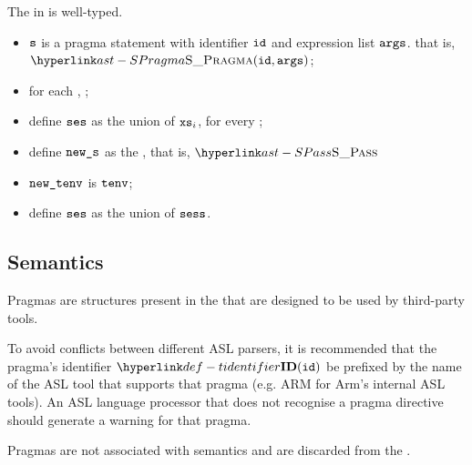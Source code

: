 The \pragmastatementterm{} in  is well-typed.

\ProseParagraph
\AllApply
\begin{itemize}
  \item $\vs$ is a pragma statement with identifier $\id$ and expression list $\vargs$. that is, $\SPragma(\id, \vargs)$;
  \item for each , \ProseOrTypeError;
  \item define $\vses$ as the union of $\vxs_i$, for every ;
  \item define $\news$ as the \passstatementterm, that is, $\SPass$
  \item $\newtenv$ is $\tenv$;
  \item define $\vses$ as the union of $\vsess$.
\end{itemize}

\FormallyParagraph
\begin{mathpar}
\end{mathpar}

\subsection{Semantics\label{sec:PragmaSemantics}}
Pragmas are structures present in the \untypedast{} that are designed to be used
by third-party tools.

To avoid conflicts between different ASL parsers, it is recommended that the pragma's identifier $\Tidentifier(\id)$ be prefixed by the name of the ASL tool that supports that pragma
(e.g. ARM for Arm's internal ASL tools). An ASL language processor that does not recognise a pragma directive should generate a warning for that pragma.

Pragmas are not associated with semantics and are discarded from the \typedast.
